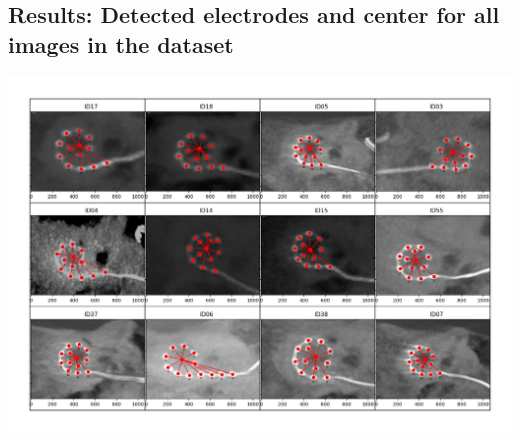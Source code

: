 \documentclass[a4paper, 10pt, twocolumn]{article}
\begin{document}


\onecolumn
\begin{landscape}
\thispagestyle{empty}
\appendix
\section{Results: Detected electrodes and center for all images in the dataset}
\mbox{} \par\includegraphics[width=1\paperwidth]{results.png}

\label{results_complete}
\noindent
\mbox{} \par
\vfill
\makebox[\linewidth]{\thepage}
\end{landscape}
\end{document}
